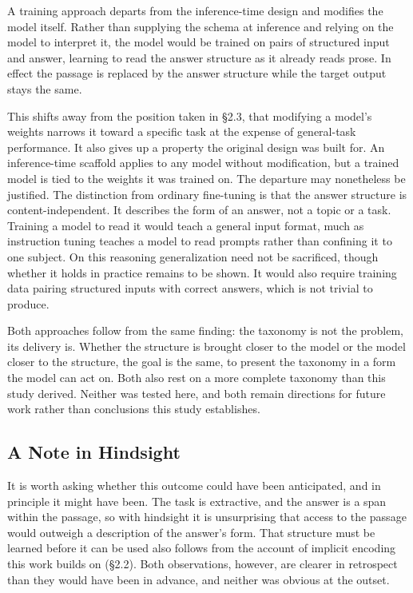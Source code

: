 \documentclass{article}
\begin{document}
A training approach departs from the inference-time design and modifies the model itself. Rather than supplying the schema at inference and relying on the model to interpret it, the model would be trained on pairs of structured input and answer, learning to read the answer structure as it already reads prose. In effect the passage is replaced by the answer structure while the target output stays the same.

This shifts away from the position taken in \S2.3, that modifying a model's weights narrows it toward a specific task at the expense of general-task performance. It also gives up a property the original design was built for. An inference-time scaffold applies to any model without modification, but a trained model is tied to the weights it was trained on. The departure may nonetheless be justified. The distinction from ordinary fine-tuning is that the answer structure is content-independent. It describes the form of an answer, not a topic or a task. Training a model to read it would teach a general input format, much as instruction tuning teaches a model to read prompts rather than confining it to one subject. On this reasoning generalization need not be sacrificed, though whether it holds in practice remains to be shown. It would also require training data pairing structured inputs with correct answers, which is not trivial to produce.

Both approaches follow from the same finding: the taxonomy is not the problem, its delivery is. Whether the structure is brought closer to the model or the model closer to the structure, the goal is the same, to present the taxonomy in a form the model can act on. Both also rest on a more complete taxonomy than this study derived. Neither was tested here, and both remain directions for future work rather than conclusions this study establishes.

\subsection{A Note in Hindsight}

It is worth asking whether this outcome could have been anticipated, and in principle it might have been. The task is extractive, and the answer is a span within the passage, so with hindsight it is unsurprising that access to the passage would outweigh a description of the answer's form. That structure must be learned before it can be used also follows from the account of implicit encoding this work builds on (\S2.2). Both observations, however, are clearer in retrospect than they would have been in advance, and neither was obvious at the outset.
\end{document}
